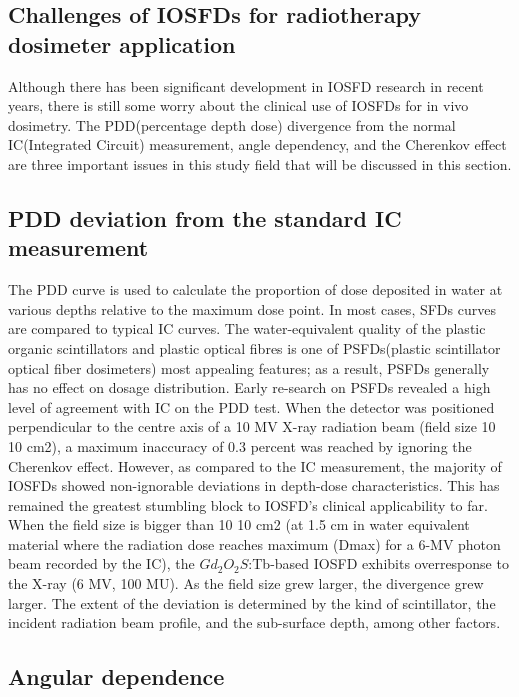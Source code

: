 \documentclass{article}
\begin{document}
\begin{multicols}{2}
\section{Challenges of IOSFDs for radiotherapy dosimeter application}

Although there has been significant development in IOSFD research in recent years, there is still some worry about the clinical use of IOSFDs for in vivo dosimetry. The PDD(percentage depth dose) divergence from the normal IC(Integrated Circuit)  measurement, angle dependency, and the Cherenkov effect are three important issues in this study field that will be discussed in this section.

\subsection{PDD deviation from the standard IC measurement}
The PDD curve is used to calculate the proportion of dose deposited in water at various depths relative to the maximum dose point. In most cases, SFDs curves are compared to typical IC curves. The water-equivalent quality of the plastic organic scintillators and plastic optical fibres is one of PSFDs(plastic scintillator optical fiber dosimeters) most appealing features; as a result, PSFDs generally has no effect on dosage distribution\cite{robinson2020monte}. Early re-search on PSFDs revealed a high level of agreement with IC on the PDD test. When the detector was positioned perpendicular to the centre axis of a 10 MV X-ray radiation beam (field size 10 10 cm2), a maximum inaccuracy of 0.3 percent was reached by ignoring the Cherenkov effect. However, as compared to the IC measurement, the majority of IOSFDs showed non-ignorable deviations in depth-dose characteristics. This has remained the greatest stumbling block to IOSFD's clinical applicability to far. When the field size is bigger than 10 10 cm2 (at 1.5 cm in water equivalent material where the radiation dose reaches maximum (Dmax) for a 6-MV photon beam recorded by the IC), the $Gd_2O_2S$:Tb-based IOSFD exhibits overresponse to the X-ray (6 MV, 100 MU). As the field size grew larger, the divergence grew larger. The extent of the deviation is determined by the kind of scintillator, the incident radiation beam profile, and the sub-surface depth, among other factors.

\subsection{Angular dependence}


\end{multicols}
\end{document}

